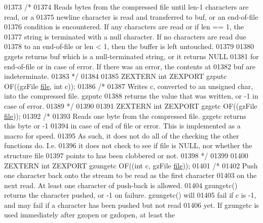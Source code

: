 \begin{DoxyCode}
01373 \textcolor{comment}{/*}
01374 \textcolor{comment}{     Reads bytes from the compressed file until len-1 characters are read, or a}
01375 \textcolor{comment}{   newline character is read and transferred to buf, or an end-of-file}
01376 \textcolor{comment}{   condition is encountered.  If any characters are read or if len == 1, the}
01377 \textcolor{comment}{   string is terminated with a null character.  If no characters are read due}
01378 \textcolor{comment}{   to an end-of-file or len < 1, then the buffer is left untouched.}
01379 \textcolor{comment}{}
01380 \textcolor{comment}{     gzgets returns buf which is a null-terminated string, or it returns NULL}
01381 \textcolor{comment}{   for end-of-file or in case of error.  If there was an error, the contents at}
01382 \textcolor{comment}{   buf are indeterminate.}
01383 \textcolor{comment}{*/}
01384 
01385 ZEXTERN \textcolor{keywordtype}{int} ZEXPORT gzputc OF((gzFile \hyperlink{structfile}{file}, \textcolor{keywordtype}{int} c));
01386 \textcolor{comment}{/*}
01387 \textcolor{comment}{     Writes c, converted to an unsigned char, into the compressed file.  gzputc}
01388 \textcolor{comment}{   returns the value that was written, or -1 in case of error.}
01389 \textcolor{comment}{*/}
01390 
01391 ZEXTERN \textcolor{keywordtype}{int} ZEXPORT gzgetc OF((gzFile \hyperlink{structfile}{file}));
01392 \textcolor{comment}{/*}
01393 \textcolor{comment}{     Reads one byte from the compressed file.  gzgetc returns this byte or -1}
01394 \textcolor{comment}{   in case of end of file or error.  This is implemented as a macro for speed.}
01395 \textcolor{comment}{   As such, it does not do all of the checking the other functions do.  I.e.}
01396 \textcolor{comment}{   it does not check to see if file is NULL, nor whether the structure file}
01397 \textcolor{comment}{   points to has been clobbered or not.}
01398 \textcolor{comment}{*/}
01399 
01400 ZEXTERN \textcolor{keywordtype}{int} ZEXPORT gzungetc OF((\textcolor{keywordtype}{int} c, gzFile \hyperlink{structfile}{file}));
01401 \textcolor{comment}{/*}
01402 \textcolor{comment}{     Push one character back onto the stream to be read as the first character}
01403 \textcolor{comment}{   on the next read.  At least one character of push-back is allowed.}
01404 \textcolor{comment}{   gzungetc() returns the character pushed, or -1 on failure.  gzungetc() will}
01405 \textcolor{comment}{   fail if c is -1, and may fail if a character has been pushed but not read}
01406 \textcolor{comment}{   yet.  If gzungetc is used immediately after gzopen or gzdopen, at least the}

\end{DoxyCode}
